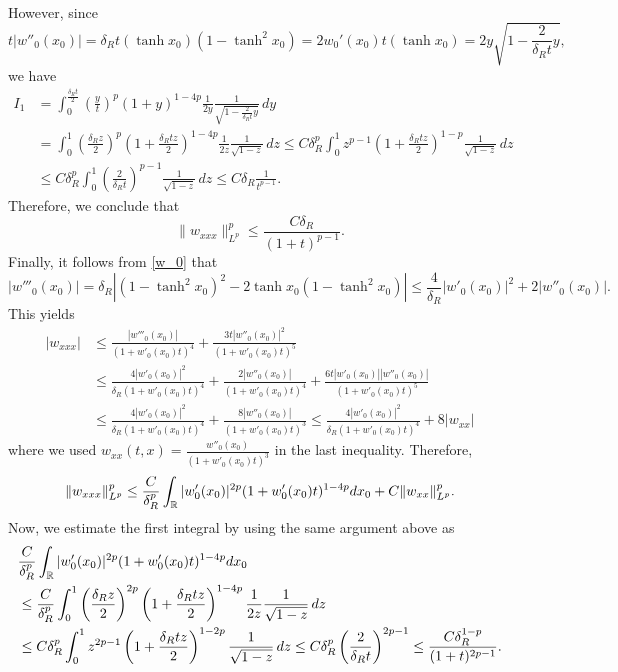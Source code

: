 \documentclass[11pt,reqno]{amsart}
\begin{document}
\begin{appendix}
\begin{align*}
\end{align*}
However, since
\[t|w''_0(x_0)|=\delta_R t (\tanh x_0)(1-\tanh ^2 x_0)=2w_0'(x_0) t(\tanh x_0)=2y\sqrt{1-\frac{2}{\delta_Rt}y},\]
we have
\begin{align*}I_1 &= \int_0^{\frac{\delta_R t}{2}}\left(\frac{y}{t}\right)^p(1+y)^{1-4p}\frac{1}{2y}\frac{1}{\sqrt{1-\frac{2}{\delta_R t}y}}\,dy\\
	&=\int_0^1 \left(\frac{\delta_R z}{2}\right)^p \left(1+\frac{\delta_R tz}{2}\right)^{1-4p}\frac{1}{2z}\frac{1}{\sqrt{1-z}}\,dz\le C\delta_R^p\int_0^1 z^{p-1}\left(1+\frac{\delta_R tz}{2}\right)^{1-p}\frac{1}{\sqrt{1-z}}\,dz\\
	&\le C\delta_R^p\int_0^1 \left(\frac{2}{\delta_R t}\right)^{p-1}\frac{1}{\sqrt{1-z}}\,dz\le C \delta_R \frac{1}{t^{p-1}}. 
\end{align*}
Therefore, we conclude that
\begin{equation}\label{w_xxx-2}
\|w_{xxx}\|_{L^p}^p\le \frac{C\delta_R}{(1+t)^{p-1}}.
\end{equation}
Finally, it follows from \eqref{w_0} that
\[|w'''_0(x_0)|=\delta_R|(1-\tanh^2 x_0)^2-2\tanh x_0(1-\tanh^2 x_0)|\le \frac{4}{\delta_R}|w'_0(x_0)|^2+2|w''_0(x_0)|.\]
This yields
\begin{align*}
	|w_{xxx}| &\le \frac{|w'''_0(x_0)|}{(1+w'_0(x_0)t)^4}+\frac{3t|w''_0(x_0)|^2}{(1+w'_0(x_0)t)^5}\\
	&\le \frac{4|w'_0(x_0)|^2}{\delta_R(1+w'_0(x_0)t)^4}+\frac{2|w''_0(x_0)|}{(1+w'_0(x_0)t)^4}+\frac{6t|w'_0(x_0)||w''_0(x_0)|}{(1+w'_0(x_0)t)^5}\\
	&\le \frac{4|w'_0(x_0)|^2}{\delta_R(1+w'_0(x_0)t)^4}+ \frac{8|w''_0(x_0)|}{(1+w'_0(x_0)t)^3}\le \frac{4|w'_0(x_0)|^2}{\delta_R(1+w'_0(x_0)t)^4}+8|w_{xx}|
\end{align*}
where we used $w_{xx}(t,x) = \frac{w''_0(x_0)}{(1+w'_0(x_0)t)^3}$ in the last inequality. Therefore, 
\begin{align*}
	\|w_{xxx}\|_{L^p}^p\le \frac{C}{\delta_R^p}\int_{\mathbb{R}} |w'_0(x_0)|^{2p}(1+w'_0(x_0)t)^{1-4p}dx_0 + C\|w_{xx}\|_{L^p}^p.
\end{align*}
Now, we estimate the first integral by using the same argument above as
\begin{align*}
	&\frac{C}{\delta_R^p}\int_\R |w'_0(x_0)|^{2p}(1+w'_0(x_0)t)^{1-4p}dx_0\\
	&\le \frac{C}{\delta_R^p} \int_0^1 \left(\frac{\delta_R z}{2}\right)^{2p}\left(1+\frac{\delta_R tz}{2}\right)^{1-4p} \frac{1}{2z}\frac{1}{\sqrt{1-z}}\,dz\\
	&\le C\delta_R^p\int_0^1 z^{2p-1}\left(1+\frac{\delta_R tz}{2}\right)^{1-2p}\frac{1}{\sqrt{1-z}}\,dz \le C\delta^p_R \left(\frac{2}{\delta_R t}\right)^{2p-1}\le \frac{C\delta_R^{1-p}}{(1+t)^{2p-1}}.

\end{align*}
\end{appendix}
\end{document}
